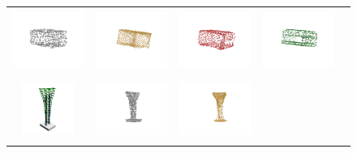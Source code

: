 \documentclass[bachelor, nocolorlinks, printoneside]{seuthesis} %
\begin{document}
\begin{Appendix}{}
\begin{figure}[!h]
\begin{tabular}{c@{}c@{}c@{}c@{}c@{}}
            \includegraphics[width=0.22\columnwidth,height=2cm]{figs/supp_real_dataset/GT/table_3942f02501161134c3bd24f986301745_gt.png} &
            \includegraphics[width=0.22\columnwidth,height=2cm]{figs/supp_real_dataset/AE_label/table_3942f02501161134c3bd24f986301745_label.png} &
            \includegraphics[width=0.22\columnwidth,height=2cm]{figs/supp_real_dataset/AE/table_3942f02501161134c3bd24f986301745_pred.png} &
            \includegraphics[width=0.22\columnwidth,height=2cm]{figs/supp_real_dataset/oracle/table_3942f02501161134c3bd24f986301745_oracle.png} \\
            \vspace{-5mm}
            \includegraphics[width=0.11\columnwidth,height=1.7cm]{figs/supp_real_dataset/Image/tower_f584f1a14904b958ba9419f3b43eb3bd.png} &
            \includegraphics[width=0.22\columnwidth,height=2cm]{figs/supp_real_dataset/GT/tower_f584f1a14904b958ba9419f3b43eb3bd_gt.png} &
            \includegraphics[width=0.22\columnwidth,height=2cm]{figs/supp_real_dataset/AE_label/tower_f584f1a14904b958ba9419f3b43eb3bd_label.png} &

\end{tabular}
\end{figure}
\end{Appendix}
\end{document}
